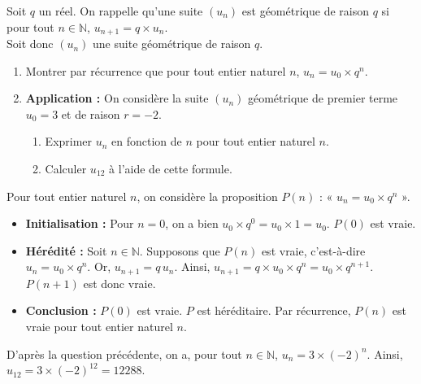 \documentclass[11pt,fleqn]{book} %
\begin{document}
\begin{exercise}
Soit $q$ un réel. On rappelle qu'une suite $(u_n)$ est géométrique de raison $q$ si pour tout $n\in\mathbb{N}$, $u_{n+1}=q\times u_n$. \\Soit donc $(u_n)$ une suite géométrique de raison $q$.
\begin{enumerate}
\item Montrer par récurrence que pour tout entier naturel $n$, $u_n=u_0 \times q^n$.
\item \textbf{Application :} On considère la suite $(u_n)$ géométrique de premier terme $u_0=3$ et de raison $r=-2$.
\begin{enumerate}
\item Exprimer $u_n$ en fonction de $n$ pour tout entier naturel $n$.
\item Calculer $u_{12}$ à l'aide de cette formule.
\end{enumerate}
\end{enumerate}\end{exercise}
\begin{solution}Pour tout entier naturel $n$, on considère la proposition $P(n)$ : « $u_n=u_0 \times q^n $ ».
\begin{itemize}
\item \textbf{Initialisation :} Pour $n=0$, on a bien $u_0 \times q^0=u_0 \times 1 = u_0$. $P(0)$ est vraie.
\item \textbf{Hérédité :} Soit $n\in\mathbb{N}$. Supposons que $P(n)$ est vraie, c'est-à-dire $u_n=u_0 \times q^n$. Or, $u_{n+1}=q\,u_n$. Ainsi, $u_{n+1}=q \times u_0 \times q^n=u_0 \times q^{n+1}$. $P(n+1)$ est donc vraie.
\item \textbf{Conclusion :} $P(0)$ est vraie. $P$ est héréditaire. Par récurrence, $P(n)$ est vraie pour tout entier naturel $n$.
\end{itemize}

D'après la question précédente, on a, pour tout  $n\in\mathbb{N}$, $u_n=3 \times (-2)^n$. Ainsi, $u_{12}=3 \times (-2)^{12}=12288$.\end{solution}
\end{document}

